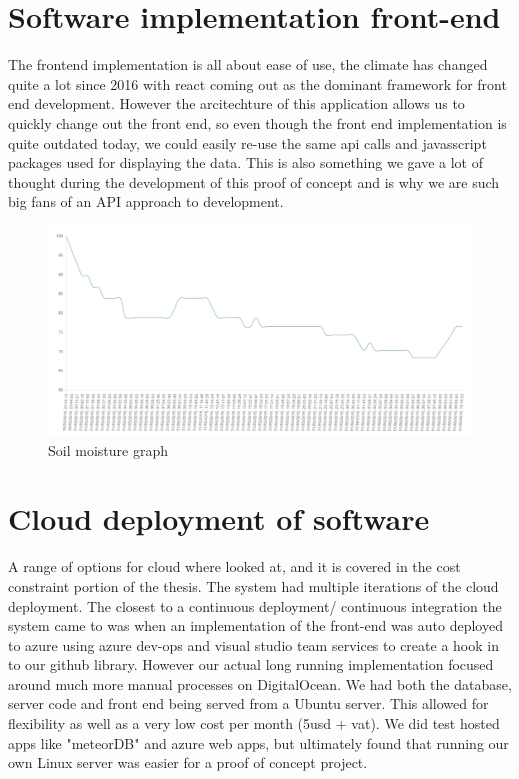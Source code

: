 \documentclass[]{uiophd}
\begin{document}
\section{Software implementation front-end}
The frontend implementation is all about ease of use, the climate has changed quite a lot since 2016 with react coming out as the dominant framework for front end development. However the arcitechture of this application allows us to quickly change out the front end, so even though the front end implementation is quite outdated today, we could easily re-use the same api calls and javasscript packages used for displaying the data. This is also something we gave a lot of thought during the development of this proof of concept and is why we are such big fans of an API approach to development. 

 \begin{figure}[h]
\caption{Soil moisture graph}
\centering
\includegraphics[width=12cm]{watergraph.png}
\end{figure}

\section{Cloud deployment of software}
A range of options for cloud where looked at, and it is covered in the cost constraint portion of the thesis. The system had multiple iterations of the cloud deployment. The closest to a continuous deployment/ continuous integration the system came to was when an implementation of the front-end was auto deployed to azure using azure dev-ops and visual studio team services to create a hook in to our github library. However our actual long running implementation focused around much more manual processes on DigitalOcean. We had both the database, server code and front end being served from a Ubuntu server. This allowed for flexibility as well as a very low cost per month (5usd + vat). We did test hosted apps like "meteorDB" and azure web apps, but ultimately found that running our own Linux server was easier for a proof of concept project.
\end{document}
